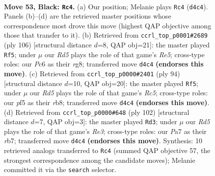 \documentclass[11pt]{article}
\begin{document}
\clearpage

\begin{figure}[p]\centering
\begin{subfigure}{0.46\textwidth}\centering
\resizebox{\linewidth}{!}{%
\newchessgame
\chessboard[
  setfen={8/p2p2k1/2p5/5P2/3r4/4K3/8/8 b - - 8 53},
  showmover=false,
  pgfstyle=straightmove, color=movearrow, markmove={d4-c4}
]}
\caption{}
\end{subfigure}\hfill
\begin{subfigure}{0.46\textwidth}\centering
\resizebox{\linewidth}{!}{%
\newchessgame
\chessboard[
  setfen={6r1/8/3k4/1P2R3/P5p1/8/1K6/8 w - - 3 54},
  showmover=false,
  pgfstyle=straightmove, color=movearrow, markmove={e5-f5}
]}
\caption{}
\end{subfigure}
\\[4pt]
\begin{subfigure}{0.46\textwidth}\centering
\resizebox{\linewidth}{!}{%
\newchessgame
\chessboard[
  setfen={1r6/8/3k1p2/1PR5/8/8/4P1K1/8 w - - 7 48},
  showmover=false,
  pgfstyle=straightmove, color=movearrow, markmove={c5-f5}
]}
\caption{}
\end{subfigure}\hfill
\begin{subfigure}{0.46\textwidth}\centering
\resizebox{\linewidth}{!}{%
\newchessgame
\chessboard[
  setfen={8/1r6/5k2/7p/7P/4R1P1/8/7K w - - 1 52},
  showmover=false,
  pgfstyle=straightmove, color=movearrow, markmove={e3-d3}
]}
\caption{}
\end{subfigure}
\caption{\textbf{Move 53, Black: \texttt{Rc4}.} (a) Our position; Melanie plays \texttt{Rc4} (\texttt{d4c4}). Panels (b)--(d) are the retrieved master positions whose correspondence most drove this move (highest QAP objective among those that transfer to it). (b) Retrieved from \texttt{ccrl\_top\_p0001\#2689} (ply 106) [structural distance $d$=8, QAP obj=21]: the master played \texttt{Rf5}; under $\mu$ our \emph{Rd5} plays the role of that game's \emph{Re5}; cross-type roles: our \emph{P}c6 as their \emph{r}g8; transferred move \texttt{d4c4} \textbf{(endorses this move)}. (c) Retrieved from \texttt{ccrl\_top\_p0000\#2401} (ply 94) [structural distance $d$=10, QAP obj=20]: the master played \texttt{Rf5}; under $\mu$ our \emph{Rd5} plays the role of that game's \emph{Rc5}; cross-type roles: our \emph{p}f5 as their \emph{r}b8; transferred move \texttt{d4c4} \textbf{(endorses this move)}. (d) Retrieved from \texttt{ccrl\_top\_p0000\#648} (ply 102) [structural distance $d$=7, QAP obj=3]: the master played \texttt{Rd3}; under $\mu$ our \emph{Rd5} plays the role of that game's \emph{Re3}; cross-type roles: our \emph{P}a7 as their \emph{r}b7; transferred move \texttt{d4c4} \textbf{(endorses this move)}. Synthesis: 10 retrieved analogs transferred to \texttt{Rc4} (summed QAP objective 57, the strongest correspondence among the candidate moves); Melanie committed it via the \texttt{search} selector.}
\label{fig:thought-m105}
\end{figure}
\end{document}

